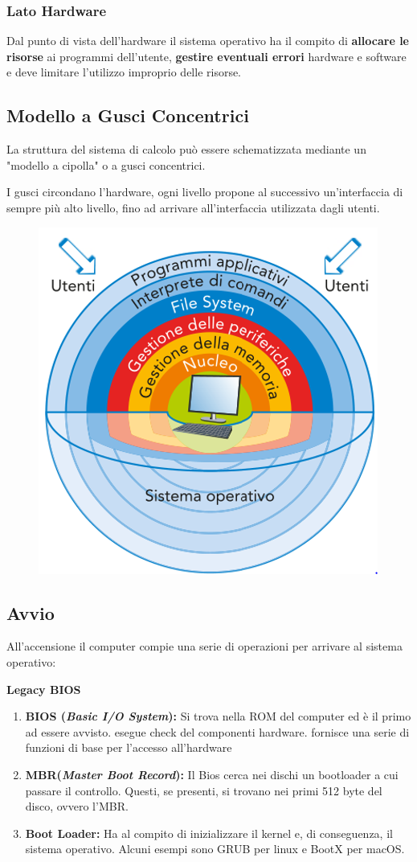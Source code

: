 \subsubsection*{Lato Hardware}
Dal punto di vista dell'hardware il sistema operativo ha il compito di \textbf{allocare le risorse} ai programmi dell'utente, \textbf{gestire eventuali errori} hardware e software e deve limitare l'utilizzo improprio delle risorse.

\subsection{Modello a Gusci Concentrici}
La struttura del sistema di calcolo può essere schematizzata mediante un "modello a cipolla" o a gusci concentrici.

I gusci circondano l'hardware, ogni livello propone al successivo un'interfaccia di sempre più alto livello, fino ad arrivare all'interfaccia utilizzata dagli utenti.

\begin{figure}[H]
    \centering
    \includegraphics[width=0.35\linewidth]{assets/modello-gusci-concentrici.png}
\end{figure}

\subsection{Avvio}
All'accensione il computer compie una serie di operazioni per arrivare al sistema operativo:

\begin{note}
    \textbf{Legacy BIOS}
    \begin{enumerate}
        \item \textbf{BIOS (\textit{Basic I/O System}):}
              Si trova nella ROM del computer ed è il primo ad essere avvisto.
              esegue check del componenti hardware.
              fornisce una serie di funzioni di base per l'accesso all'hardware
        \item \textbf{MBR(\textit{Master Boot Record}):}
              Il Bios cerca nei dischi un bootloader a cui passare il controllo.
              Questi, se presenti, si trovano nei primi 512 byte del disco, ovvero l'MBR.
        \item \textbf{Boot Loader:}
              Ha al compito di inizializzare il kernel e, di conseguenza, il sistema operativo. Alcuni esempi sono GRUB per linux e BootX per macOS.
    \end{enumerate}
\end{note}

